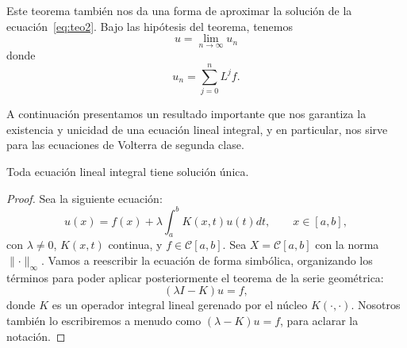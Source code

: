 \begin{observacion}
	Este teorema también nos da una forma de aproximar la solución de la ecuación~\eqref{eq:teo2}. Bajo las hipótesis del teorema, tenemos
	\begin{equation}
		u = \lim_{n \rightarrow \infty}u_n
	\end{equation}
	donde
	\begin{equation}
		u_n = \sum_{j=0}^{n}L^jf.
	\end{equation}
\end{observacion}
A continuación presentamos un resultado importante que nos garantiza la existencia y unicidad de una ecuación lineal integral, y en particular, nos sirve para las ecuaciones de Volterra de segunda clase.
\begin{corolario}\label{ej:1}
	Toda ecuación lineal integral tiene solución única.
	\begin{proof}
		Sea la siguiente ecuación:
			\begin{equation}
			u(x) = f(x) + \lambda \int_{a}^{b}K(x,t)u(t)dt, \qquad x \in [a,b],
		\end{equation}
		con $\lambda \neq 0$, $K(x,t)$ continua, y $f \in \mathcal{C}[a,b]$. Sea $X = \mathcal{C}[a,b]$ con la norma $\lVert \cdot \rVert_\infty$. Vamos a reescribir la ecuación de forma simbólica, organizando los términos para poder aplicar posteriormente el teorema de la serie geométrica:
		\begin{equation}
			(\lambda I-K)u = f,
		\end{equation}
		donde $K$ es un operador integral lineal gerenado por el núcleo $K (\cdot , \cdot )$. Nosotros también lo escribiremos a menudo como $(\lambda - K)u = f$, para aclarar la notación.
		

\end{proof}
\end{corolario}
